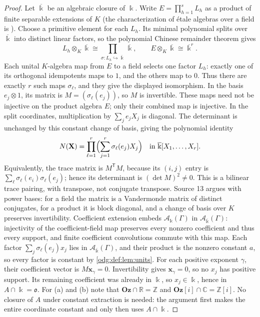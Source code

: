 \documentclass[11pt,oneside]{article}
\numberwithin{equation}{section}
\theoremstyle{definition}
\theoremstyle{remark}
\newcommand{\Oz}{\mathbf{Oz}}
\newcommand{\Z}{\mathbb Z}
\newcommand{\R}{\mathbb R}
\newcommand{\C}{\mathbb C}
\newcommand{\Og}{\Oz[i]}
\begin{document}
\begin{proof}
Let $\overline\Bbbk$ be an algebraic closure of $\Bbbk$. Write
$E=\prod_{h=1}^s L_h$ as a product of finite separable extensions of $K$
(the characterization of \'etale algebras over a field is
\cite[Lemma 10.143.4]{StacksEtaleField}). Choose a primitive element for
each $L_h$. Its minimal polynomial splits over $\overline\Bbbk$ into
distinct linear factors, so the polynomial Chinese remainder theorem
gives
\[
 L_h\otimes_K\overline\Bbbk\cong
 \prod_{\sigma:L_h\hookrightarrow\overline\Bbbk}\overline\Bbbk,
 \qquad E\otimes_K\overline\Bbbk\cong\overline\Bbbk^r.
\]
Each unital $K$-algebra map from $E$ to a field selects one factor
$L_h$: exactly one of its orthogonal idempotents maps to $1$, and
the others map to $0$.
Thus there are exactly $r$ such maps $\sigma_\ell$, and they give the
displayed isomorphism. In the basis $e_j\otimes1$, its matrix is
$M=(\sigma_\ell(e_j))$, so $M$ is invertible. These maps need not be
injective on the product algebra $E$; only their combined map is injective.
In the split coordinates, multiplication by $\sum_je_jX_j$ is diagonal.
The determinant is unchanged by this constant change of basis, giving
the polynomial identity
\[
 N(\mathbf X)=\prod_{\ell=1}^{r}\Bigl(\sum_{j=1}^{r}\sigma_\ell(e_j)X_j\Bigr)
 \quad\text{in }\overline\Bbbk[X_1,\ldots,X_r].
\]
Equivalently, the trace matrix is $M^{\mathsf T}M$, because its
$(i,j)$ entry is $\sum_\ell\sigma_\ell(e_i)\sigma_\ell(e_j)$; hence its
determinant is $(\det M)^2\ne0$. This is a bilinear trace pairing,
with transpose, not conjugate transpose. Source 13 argues with power bases:
for a field the matrix is a Vandermonde matrix of distinct conjugates, for a
product it is block diagonal, and a change of basis over $K$ preserves
invertibility. Coefficient extension embeds $\mathcal A_\Bbbk(\Gamma)$ in
$\mathcal A_{\overline\Bbbk}(\Gamma)$: injectivity of the coefficient-field
map preserves every nonzero coefficient and thus every support, and finite
coefficient convolutions commute with this map. Each factor
$\sum_j\sigma_\ell(e_j)x_j$ lies in $\mathcal A_{\overline\Bbbk}(\Gamma)$, and
their product is the nonzero constant $a$, so every factor is constant by
\cref{odg:def:lem:units}. For each positive exponent $\gamma$, their
coefficient vector is $M\mathbf x_\gamma=0$. Invertibility gives
$\mathbf x_\gamma=0$, so no $x_j$ has positive support. Its remaining
coefficient was already in $\Bbbk$, so $x_j\in\Bbbk$, hence
in $A\cap\Bbbk=\mathfrak o$. For (a) and (b) note that $\Oz\cap\R=\Z$ and
$\Og\cap\C=\Z[i]$.
No closure of $A$ under constant extraction is needed: the argument first
makes the entire coordinate constant and only then uses $A\cap\Bbbk$.
\end{proof}
\end{document}

